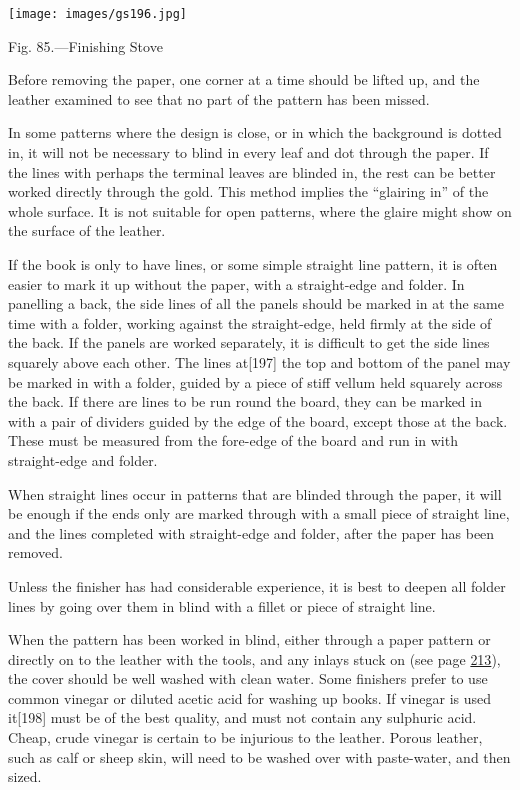 \documentclass[
]{article}
\begin{document}
\protect\hypertarget{Fig_85}{}{}
\texttt{[image: images/gs196.jpg]}

Fig. 85.---Finishing Stove

Before removing the paper, one corner at a time should be lifted up, and
the leather examined to see that no part of the pattern has been missed.

In some patterns where the design is close, or in which the background
is dotted in, it will not be necessary to blind in every leaf and dot
through the paper. If the lines with perhaps the terminal leaves are
blinded in, the rest can be better worked directly through the gold.
This method implies the ``glairing in'' of the whole surface. It is not
suitable for open patterns, where the glaire might show on the surface
of the leather.

If the book is only to have lines, or some simple straight line pattern,
it is often easier to mark it up without the paper, with a straight-edge
and folder. In panelling a back, the side lines of all the panels should
be marked in at the same time with a folder, working against the
straight-edge, held firmly at the side of the back. If the panels are
worked separately, it is difficult to get the side lines squarely above
each other. The lines at{\protect\hypertarget{Page_197}{}{{[}197{]}}}
the top and bottom of the panel may be marked in with a folder, guided
by a piece of stiff vellum held squarely across the back. If there are
lines to be run round the board, they can be marked in with a pair of
dividers guided by the edge of the board, except those at the back.
These must be measured from the fore-edge of the board and run in with
straight-edge and folder.

When straight lines occur in patterns that are blinded through the
paper, it will be enough if the ends only are marked through with a
small piece of straight line, and the lines completed with straight-edge
and folder, after the paper has been removed.

Unless the finisher has had considerable experience, it is best to
deepen all folder lines by going over them in blind with a fillet or
piece of straight line.

When the pattern has been worked in blind, either through a paper
pattern or directly on to the leather with the tools, and any inlays
stuck on (see page \protect\hyperlink{Page_213}{213}), the cover should
be well washed with clean water. Some finishers prefer to use common
vinegar or diluted acetic acid for washing up books. If vinegar is used
it{\protect\hypertarget{Page_198}{}{{[}198{]}}} must be of the best
quality, and must not contain any sulphuric acid. Cheap, crude vinegar
is certain to be injurious to the leather. Porous leather, such as calf
or sheep skin, will need to be washed over with paste-water, and then
sized.
\end{document}
